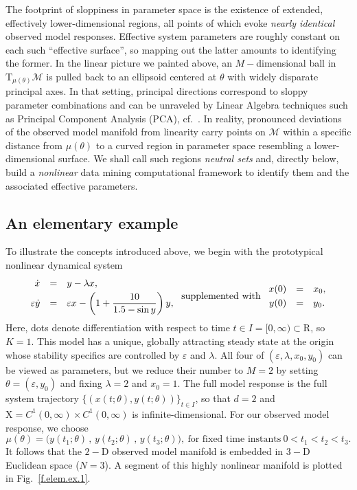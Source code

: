 \documentclass{article}
\newcommand{\eps}{\varepsilon}
\newcommand{\p}{\theta}
\newcommand{\omr}{\mu}
\newcommand{\omm}{\mathcal{M}}
\newcommand{\R}{\mathrm{R}}
\newcommand{\fms}{\mathrm{X}}
\newcommand{\be}{\begin{equation}}
\newcommand{\ee}{\end{equation}}
\begin{document}
The footprint of sloppiness in parameter space
is the existence of extended, effectively lower-dimensional regions,
all points of which evoke \emph{nearly identical} observed model responses.
Effective system parameters are roughly constant on each such ``effective surface'',
so mapping out the latter amounts to identifying the former.
In the linear picture we painted above,
an $M-$dimensional ball in $\mathrm{T}_{\omr(\p)}\omm$
is pulled back to an ellipsoid centered at $\p$
with widely disparate principal axes.
In that setting, principal directions correspond to sloppy parameter combinations
and can be unraveled by Linear Algebra techniques
such as Principal Component Analysis (PCA), cf.~\cite{ADS06}.
In reality, pronounced deviations of the observed model manifold from linearity
carry points on $\omm$ within a specific distance from $\omr(\p)$
to a curved region in parameter space
resembling a lower-dimensional surface.
We shall call such regions \emph{neutral sets} and, directly below,
build a \emph{nonlinear} data mining computational framework
to identify them and the associated effective parameters.\\

\subsection{An elementary example \label{ss-elem.ex}}
%
To illustrate the concepts introduced above,
we begin with the prototypical nonlinear dynamical system
%
\be
\begin{array}{rcl}
 \dot{x} &=& y - \lambda x ,
\vspace*{1mm}\\
 \eps \dot{y} &=& \eps x - \displaystyle\left(1+\frac{10}{1.5-\sin y}\right) y ,
\end{array}
\ \mbox{supplemented with} \
\begin{array}{rcl}
 x(0) &=& x_0 ,
\vspace*{1mm}\\
 y(0) &=& y_0 .
\end{array}
\label{elem-ODE}
\ee
%
Here, dots denote differentiation with respect to time $t \in I = [0,\infty) \subset \R$, so $K=1$.
This model has a unique, globally attracting steady state at the origin
whose stability specifics are controlled by $\eps$ and $\lambda$.
All four of $(\eps,\lambda,x_0,y_0)$ can be viewed as parameters,
but we reduce their number to $M=2$ by setting $\p = (\eps,y_0)$ and fixing $\lambda= 2$ and $x_0 = 1$.
The full model response is the full system trajectory $\{(x(t;\p),y(t;\p))\}_{t \in I}$, so that $d = 2$ and $\fms = C^1(0,\infty) \times C^1(0,\infty)$ is infinite-dimensional.
For our observed model response, we choose
%
\be
 \mu(\p) = \big( y(t_1;\p) \,,\, y(t_2;\p) \,,\, y(t_3;\p) \big) ,
\ \mbox{for fixed time instants} \
 0 < t_1 < t_2 < t_3 .
\label{elem-mu}
\ee
%
It follows that the $2-$D observed model manifold is embedded in $3-$D Euclidean space ($N=3$).
A segment of this highly nonlinear manifold is plotted in Fig.~\ref{f.elem.ex.1}.\\
\end{document}
